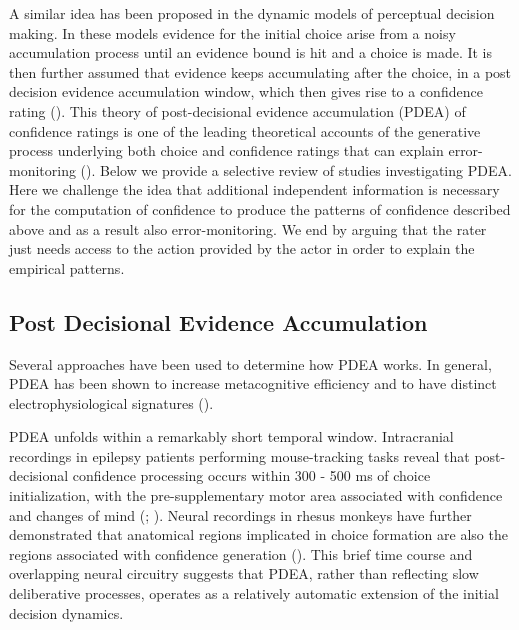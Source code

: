 \documentclass[
]{article}
\begin{document}
A similar idea has been proposed in the dynamic models of perceptual
decision making. In these models evidence for the initial choice arise
from a noisy accumulation process until an evidence bound is hit and a
choice is made. It is then further assumed that evidence keeps
accumulating after the choice, in a post decision evidence accumulation
window, which then gives rise to a confidence rating
(). This theory of post-decisional evidence
accumulation (PDEA) of confidence ratings is one of the leading
theoretical accounts of the generative process underlying both choice
and confidence ratings that can explain error-monitoring
(). Below we provide a selective review of studies
investigating PDEA. Here we challenge the idea that additional
independent information is necessary for the computation of confidence
to produce the patterns of confidence described above and as a result
also error-monitoring. We end by arguing that the rater just needs
access to the action provided by the actor in order to explain the
empirical patterns.

\subsection{Post Decisional Evidence
Accumulation}\label{post-decisional-evidence-accumulation}

Several approaches have been used to determine how PDEA works. In
general, PDEA has been shown to increase metacognitive efficiency and to
have distinct electrophysiological signatures
().

PDEA unfolds within a remarkably short temporal window. Intracranial
recordings in epilepsy patients performing mouse-tracking tasks reveal
that post-decisional confidence processing occurs within 300 - 500 ms of
choice initialization, with the pre-supplementary motor area associated
with confidence and changes of mind
(;
). Neural recordings in rhesus monkeys have further demonstrated
that anatomical regions implicated in choice formation are also the
regions associated with confidence generation
(). This brief time course and overlapping neural
circuitry suggests that PDEA, rather than reflecting slow deliberative
processes, operates as a relatively automatic extension of the initial
decision dynamics.
\end{document}
